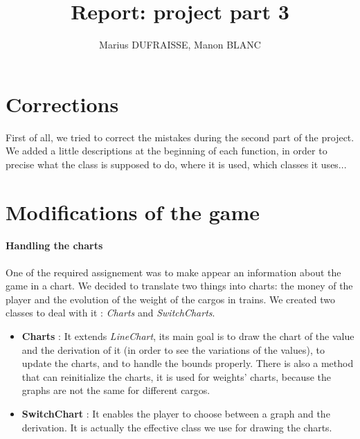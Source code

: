 \documentclass[a4paper]{article}
\title{Report: project part 3}
\author{Marius DUFRAISSE, Manon BLANC}
\date{  }
\begin{document}
	\maketitle
	\thispagestyle{fancy}
	\section{Corrections}
	
	First of all, we tried to correct the mistakes during the second part of the project. We added a little descriptions at the beginning of each function, in order to precise what the class is supposed to do, where it is used, which classes it uses...
	
	\section{Modifications of the game}
	
	\paragraph{Handling the charts} 
	One of the required assignement was to make appear an information about the game in a chart. We decided to translate two things into charts: the money of the player and the evolution of the weight of the cargos in trains. We created two classes to deal with it : \textit{Charts} and \textit{SwitchCharts}. 
	\begin{itemize}
		\item \textbf{Charts }: It extends \textit{LineChart}, its main goal is to draw the chart of the value and the derivation of it (in order to see the variations of the values), to update the charts, and to handle the bounds properly. There is also a method that can reinitialize the charts, it is used for weights' charts, because the graphs are not the same for different cargos.
		\item \textbf{SwitchChart} : It enables the player to choose between a graph and the derivation. It is actually the effective class we use for drawing the charts.
	\end{itemize} 
\end{document}
